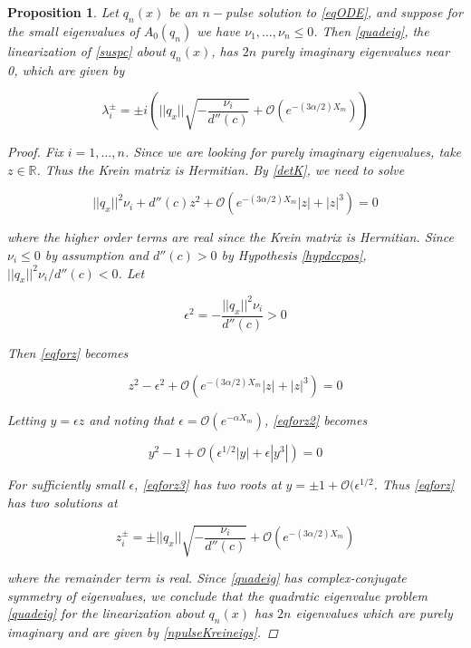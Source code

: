 \documentclass[12pt]{article}
\def\R{{\mathbb R}}
\newtheorem{proposition}{Proposition}
\begin{document}
\begin{proposition}
Let $q_n(x)$ be an $n-$pulse solution to \eqref{eqODE}, and suppose for the small eigenvalues of $A_0(q_n)$ we have $\nu_1, \dots, \nu_n \leq 0$. Then \eqref{quadeig}, the linearization of \eqref{suspc} about $q_n(x)$, has $2n$ purely imaginary eigenvalues near 0, which are given by

\begin{equation}\label{npulseKreineigs}
\lambda_i^\pm = \pm i \left( ||q_x|| \sqrt{ -\frac{ \nu_i}{d''(c)} } + \mathcal{O}(e^{-(3 \alpha/2) X_m}) \right)
\end{equation}

\begin{proof}
Fix $i = 1, \dots, n$. Since we are looking for purely imaginary eigenvalues, take $z \in \R$. Thus the Krein matrix is Hermitian. By \eqref{detK}, we need to solve

\begin{equation}\label{eqforz}
||q_x||^2 \nu_i + d''(c) z^2 + \mathcal{O}(e^{-(3 \alpha/2) X_m}|z| + |z|^3) = 0
\end{equation}

where the higher order terms are real since the Krein matrix is Hermitian. Since $\nu_i \leq 0$ by assumption and $d''(c) > 0$ by Hypothesis \ref{hypdccpos}, $||q_x||^2 \nu_i / d''(c) < 0$. Let

\begin{equation}
\epsilon^2 = -\frac{||q_x||^2 \nu_i}{d''(c)} > 0
\end{equation}

Then \eqref{eqforz} becomes

\begin{equation}\label{eqforz2}
z^2 - \epsilon^2 + \mathcal{O}(e^{-(3 \alpha/2) X_m}|z| + |z|^3) = 0
\end{equation}

Letting $y = \epsilon z$ and noting that $\epsilon = \mathcal{O}(e^{-\alpha X_m})$, \eqref{eqforz2} becomes

\begin{equation}\label{eqforz3}
y^2 - 1 + \mathcal{O}(\epsilon^{1/2 }|y| + \epsilon|y^3|) = 0
\end{equation}

For sufficiently small $\epsilon$, \eqref{eqforz3} has two roots at $y = \pm 1 + \mathcal{O}(\epsilon^{1/2}$. Thus \eqref{eqforz} has two solutions at

\begin{equation}
z_i^\pm = \pm ||q_x|| \sqrt{ -\frac{ \nu_i}{d''(c)} } + \mathcal{O}(e^{-(3 \alpha/2) X_m})
\end{equation}

where the remainder term is real. Since \eqref{quadeig} has complex-conjugate symmetry of eigenvalues, we conclude that the quadratic eigenvalue problem \eqref{quadeig} for the linearization about $q_n(x)$ has $2n$ eigenvalues which are purely imaginary and are given by \eqref{npulseKreineigs}.

\end{proof}
\end{proposition}



\end{document}

